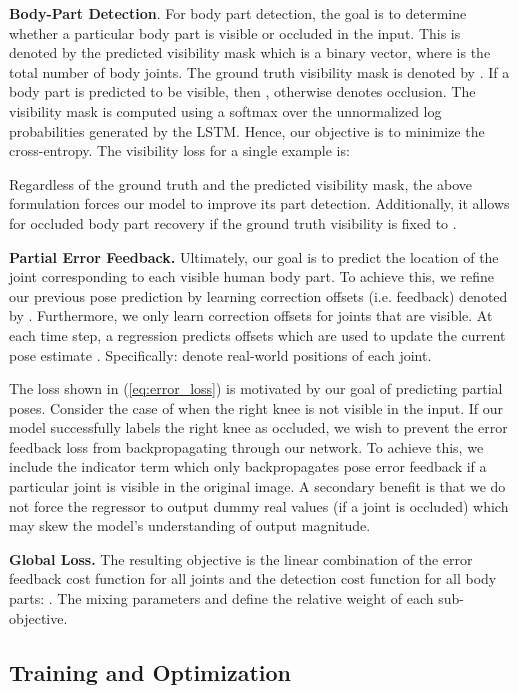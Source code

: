\documentclass[runningheads]{llncs}
\begin{document}
	\textbf{Body-Part Detection}. For body part detection, the goal is to determine whether a particular body part is visible or occluded in the input. This is denoted by the predicted visibility mask  which is a  binary vector, where  is the total number of body joints. The ground truth visibility mask is denoted by . If a body part is predicted to be visible, then , otherwise  denotes occlusion. The visibility mask  is computed using a softmax over the unnormalized log probabilities  generated by the LSTM. Hence, our objective is to minimize the cross-entropy. The visibility loss for a single example is:
	
	Regardless of the ground truth and the predicted visibility mask, the above formulation forces our model to improve its part detection. Additionally, it allows for occluded body part recovery if the ground truth visibility is fixed to .

	\textbf{Partial Error Feedback.} Ultimately, our goal is to predict the location of the joint corresponding to each visible human body part. To achieve this, we refine our previous pose prediction by learning correction offsets (i.e. feedback) denoted by . Furthermore, we only learn correction offsets for joints that are visible. At each time step, a regression predicts offsets  which are used to update the current pose estimate . Specifically:  denote real-world  positions of each joint.
	
	The loss shown in (\ref{eq:error_loss}) is motivated by our goal of predicting partial poses. Consider the case of when the right knee is not visible in the input.
	If our model successfully labels the right knee as occluded, we wish to prevent the error feedback loss from backpropagating through our network.
	To achieve this, we include the indicator term  which only backpropagates pose error feedback if a particular joint is visible in the original image. A secondary benefit is that we do not force the regressor to output dummy real values (if a joint is occluded) which may skew the model's understanding of output magnitude.

	\textbf{Global Loss.} The resulting objective is the linear combination of the error feedback cost function for all joints and the detection cost function for all body parts: . The mixing parameters  and  define the relative weight of each sub-objective.

	\subsection{Training and Optimization}
\end{document}
